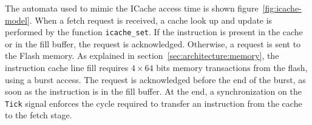     The automata used to mimic the ICache access time is shown figure~\ref{fig:icache-model}.
    When a fetch request is received, a cache look up and update is performed by the function \texttt{icache\_set}.
    If the instruction is present in the cache or in the fill buffer, the request is acknowledged.
    Otherwise, a request is sent to the Flash memory.
    As explained in section~\ref{sec:architecture:memory}, the instruction cache line fill requires $4\times64$ bits memory transactions from the flash, using a burst access.
    The request is acknowledged before the end of the burst, as soon as the instruction is in the fill buffer. 
    At the end, a synchronization on the \texttt{Tick} signal enforces the cycle required to transfer an instruction from the cache to the fetch stage.










